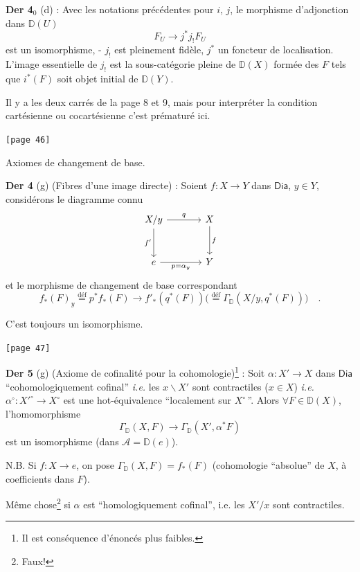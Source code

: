 \documentclass[11pt]{article}
\newcommand{\printedpage}[1]{\marginpar{\footnotesize p.~#1}}
\newcommand{\msp}[1]{\marginpar{\footnotesize [#1]}}
\newcommand{\D}{\mathbb{D}}
\newcommand{\Dia}{\mathsf{Dia}}
\begin{document}
\printedpage{25}

\noindent\textbf{Der 4}$_{0}$ (d) : Avec les notations précédentes pour $i$, $j$, le morphisme d'adjonction dans $\D(U)$
\[ F_{U} \longrightarrow j^{*} j_{!} F_{U} \]
est un isomorphisme, - $j_{!}$ est pleinement fidèle, $j^{*}$ un foncteur de localisation. L'image essentielle de $j_{!}$ est la sous-catégorie pleine de $\D(X)$ formée des $F$ tels que $i^{*}(F)$ soit objet initial de $\D(Y)$.

Il y a les deux carrés de la page 8 et 9, mais pour interpréter la condition cartésienne ou cocartésienne c'est prématuré ici.

\noindent\msp{page 46}\texttt{[page 46]}

\noindent Axiomes de changement de base.

\noindent\textbf{Der 4} (g) (Fibres d'une image directe) : Soient $f : X \to Y$ dans $\Dia$, $y \in Y$, considérons le diagramme connu
\[
\begin{tikzcd}[row sep=large, column sep=large]
X/y \arrow[r, "q"] \arrow[d, "f'"'] & X \arrow[d, "f"] \\
e \arrow[r, "p = \alpha_{y}"'] & Y
\end{tikzcd}
\]
et le morphisme de changement de base correspondant
\[ f_{*}(F)_{y} \overset{\text{déf}}{=} p^{*} f_{*}(F) \longrightarrow f'_{*}(q^{*}(F))\bigl(\overset{\text{déf}}{=} \Gamma_{\D}(X/y, q^{*}(F))\bigr) \quad . \]

\noindent C'est toujours un isomorphisme.

\noindent\msp{page 47}\texttt{[page 47]}

\noindent\textbf{Der 5} (g) (Axiome de cofinalité pour la cohomologie)\footnote[14]{Il est conséquence d'énoncés plus faibles.} : Soit $\alpha : X' \to X$ dans $\Dia$ “cohomologiquement cofinal” \textit{i.e.} les $x\backslash X'$ sont contractiles ($x \in X$) \textit{i.e.} $\alpha^{\circ} : {X'}^{\circ} \to X^{\circ}$ est une hot-équivalence “localement sur $X^{\circ}$\,”. Alors $\forall F \in \D(X)$, l'homomorphisme
\[ \Gamma_{\D}(X, F) \longrightarrow \Gamma_{\D}(X', \alpha^{*} F) \]
est un isomorphisme (dans $\mathcal{A} = \D(e)$).

\noindent N.B. Si $f : X \to e$, on pose $\Gamma_{\D}(X, F) = f_{*}(F)$ (cohomologie “absolue” de $X$, à coefficients dans $F$).

\noindent Même chose\footnote[15]{Faux!} si $\alpha$ est “homologiquement cofinal”, i.e. les $X'/x$ sont contractiles.


\printedpage{26}
\end{document}
